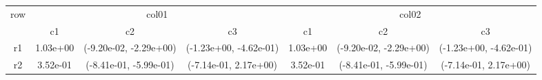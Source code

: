 \begin{tabular}{ccccccc}
\toprule
\multirow{2}{*}{row}&\multicolumn{3}{c}{col01}&\multicolumn{3}{c}{col02}\tabularnewline
\cmidrule(lr){2-4}
\cmidrule(lr){5-7}
&c1&c2&c3&c1&c2&c3\tabularnewline
\midrule
r1&1.03e+00& (-9.20e-02, -2.29e+00)& (-1.23e+00, -4.62e-01)&1.03e+00& (-9.20e-02, -2.29e+00)& (-1.23e+00, -4.62e-01)\tabularnewline
r2&3.52e-01& (-8.41e-01, -5.99e-01)& (-7.14e-01, 2.17e+00)&3.52e-01& (-8.41e-01, -5.99e-01)& (-7.14e-01, 2.17e+00)\tabularnewline
\bottomrule
\end{tabular}
